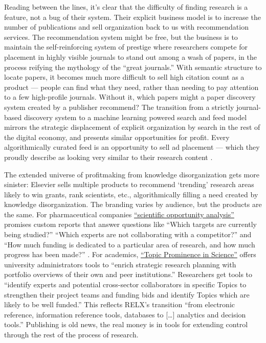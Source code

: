 Reading between the lines, it's clear that the difficulty of finding
research is a feature, not a bug of their system. Their explicit
business model is to increase the number of publications and sell
organization back to us with recommendation services. The recommendation
system might be free, but the business is to maintain
the self-reinforcing system of prestige where researchers compete for
placement in highly visible journals to stand out among a wash of
papers, in the process reifying the mythology \citep{brembsPrestigiousScienceJournals2018}  of the ``great journals.''
With semantic structure to locate papers, it becomes much more difficult
to sell high citation count as a product --- people can find what they
need, rather than needing to pay attention to a few high-profile
journals. Without it, which papers might a paper discovery system
created by a publisher recommend? The transition from a strictly
journal-based discovery system to a machine learning powered search and
feed model mirrors the strategic displacement of explicit organization
by search in the rest of the digital economy, and presents similar
opportunities for profit. Every algorithmically curated feed is an
opportunity to sell ad placement --- which they
proudly describe as looking very similar to their research content \citep{springernatureBrandedContent, elsevier360AdvertisingSolutions} .

The extended universe of profitmaking from knowledge disorganization
gets more sinister: Elsevier sells multiple products to recommend
`trending' research areas likely to win grants, rank scientists, etc.,
algorithmically filling a need created by knowledge disorganization. The
branding varies by audience, but the products are the same. For
pharmaceutical companies
\href{https://www.elsevier.com/solutions/professional-services/drug-design-optimization\#opportunity}{``scientific
opportunity analysis''} promises custom reports that answer questions
like ``Which targets are currently being studied?'' ``Which experts are
not collaborating with a competitor?'' and ``How much funding is
dedicated to a particular area of research, and how much progress has
been made?'' \citep{elsevierDrugDesignOptimization} . For
academics,
\href{https://www.elsevier.com/solutions/scival/features/topic-prominence-in-science\#how}{``Topic
Prominence in Science''} offers university administrators tools to
``enrich strategic research planning with portfolio overviews of their
own and peer institutions.'' Researchers get tools to ``identify experts
and potential cross-sector collaborators in specific Topics to
strengthen their project teams and funding bids and identify Topics
which are likely to be well funded.'' \citep{elsevierTopicProminenceScienceb}  This reflects RELX's transition
``from electronic reference, information reference tools, databases to
{[}\ldots{]} analytics and decision tools.'' \citep{relxRELX2020Results2021}  Publishing is old news, the real money is
in tools for extending control through the rest of the process of
research.

